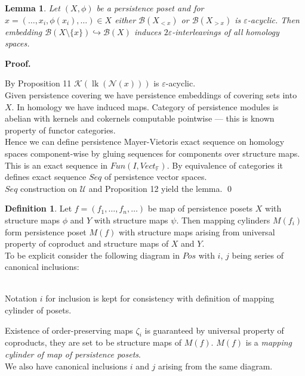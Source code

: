 \documentclass[a4paper, 12pt]{article}
\newtheorem{lemma}{Lemma}
\theoremstyle{definition}
\newtheorem{definition}{Definition}
\theoremstyle{remark}
\newenvironment{pf}{\noindent\textbf{Proof.}}{\qed}
\newcommand{\define}[1]{{\textit{#1}}}
\begin{document}
\begin{lemma}
  Let $(X,\phi)$ be a persistence poset and for $x=(\ldots,x_i,\phi(x_i),\ldots) \in X$ either $\mathcal{B}(X_{< x})$ or $\mathcal{B}(X_{> x})$ is $\varepsilon$-acyclic. Then embedding $\mathcal{B}(X \setminus \{x\}) \hookrightarrow \mathcal{B}(X)$ induces $2\varepsilon$-interleavings of all homology spaces.
\end{lemma}

\begin{pf} ~ \par
  By Proposition 11 $\mathcal{K}(\operatorname{lk}(\mathcal{N}(x)))$ is $\varepsilon$-acyclic.\\

  Given persistence covering we have persistence embeddings of covering sets into $X$. In homology we have induced maps. Category of persistence modules is abelian with kernels and cokernels computable pointwise --- this is known property of functor categories.\\

  Hence we can define persistence Mayer-Vietoris exact sequence on homology spaces component-wise by gluing sequences for components over structure maps. This is an exact sequence in $Fun(I,Vect_{\mathbb{F}})$. By equivalence of categories it defines exact sequence $Seq$ of persistence vector spaces.\\

  $Seq$ construction on $\mathcal{U}$ and Proposition 12 yield the lemma.
\end{pf}

\begin{definition}
  Let $f = (f_1,\ldots,f_n,\ldots)$ be map of persistence posets $X$ with structure maps $\phi$ and $Y$ with structure maps $\psi$. Then mapping cylinders $M(f_i)$ form persistence poset $M(f)$ with structure maps arising from universal property of coproduct and structure maps of $X$ and $Y$.\\

  To be explicit consider the following diagram in $Pos$ with $i$, $j$ being series of canonical inclusions:\\
  \\
  Notation $i$ for inclusion is kept for consistency with definition of mapping cylinder of posets.

  Existence of order-preserving maps $\zeta_i$ is guaranteed by universal property of coproducts, they are set to be structure maps of $M(f)$. $M(f)$ is a \define{mapping cylinder of map of persistence posets}.\\

  We also have canonical inclusions $i$ and $j$ arising from the same diagram.
\end{definition}
\end{document}
